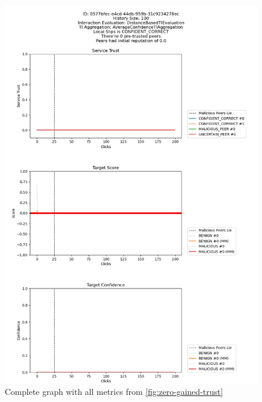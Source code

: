 \begin{figure}
    \centering
    \includegraphics[width=1.0\textwidth]{assets/zero_gained_trust_all.png}
    \caption{Complete graph with all metrics from \ref{fig:zero-gained-trust}}
    \label{fig:zero-gained-trust-all}
\end{figure}

\newpage
